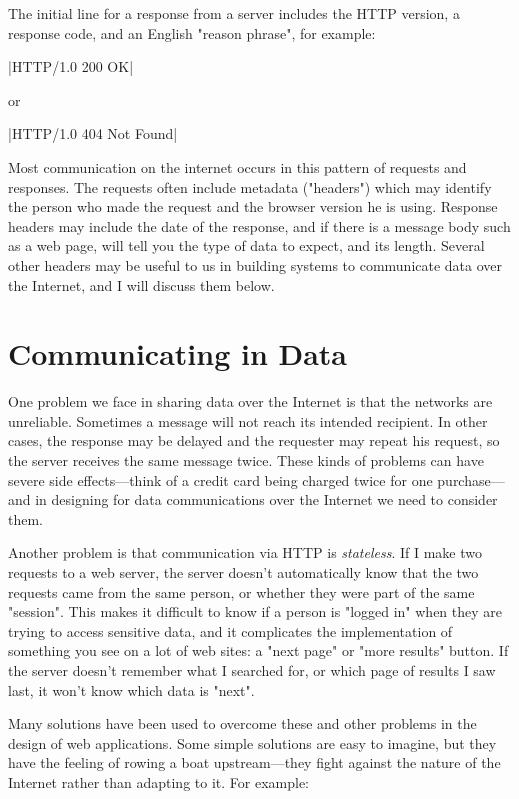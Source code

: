 \documentclass[11pt]{book}
\newcommand{\term}[1]{\emph{#1}} %
\begin{document}
The initial line for a response from a server includes the HTTP version, a response code, and an English "reason phrase", for example:

|HTTP/1.0 200 OK|

or

|HTTP/1.0 404 Not Found|

Most communication on the internet occurs in this pattern of requests and responses.  The requests often include metadata ("headers") which may identify the person who made the request and the browser version he is using.  Response headers may include the date of the response, and if there is a message body such as a web page, will tell you the type of data to expect, and its length.  Several other headers may be useful to us in building systems to communicate data over the Internet, and I will discuss them below.

\section{Communicating in Data}

One problem we face in sharing data over the Internet is that the networks are unreliable.  Sometimes a message will not reach its intended recipient.  In other cases, the response may be delayed and the requester may repeat his request, so the server receives the same message twice.  These kinds of problems can have severe side effects---think of a credit card being charged twice for one purchase---and in designing for data communications over the Internet we need to consider them.

Another problem is that communication via HTTP is \term{stateless}.  If I make two requests to a web server, the server doesn't automatically know that the two requests came from the same person, or whether they were part of the same "session".  This makes it difficult to know if a person is "logged in" when they are trying to access sensitive data, and it complicates the implementation of something you see on a lot of web sites: a "next page" or "more results" button.  If the server doesn't remember what I searched for, or which page of results I saw last, it won't know which data is "next".

Many solutions have been used to overcome these and other problems in the design of web applications.  Some simple solutions are easy to imagine, but they have the feeling of rowing a boat upstream---they fight against the nature of the Internet rather than adapting to it.  For example:
\end{document}
